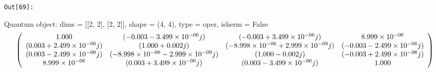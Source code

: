 \documentclass[11pt]{article}
\begin{document}
\texttt{\color{outcolor}Out[{\color{outcolor}69}]:}
    
    Quantum object: dims = [[2, 2], [2, 2]], shape = (4, 4), type = oper, isherm = False\begin{equation*}\left(\begin{array}{*{11}c}1.000 & (-0.003-3.499\times10^{-06}j) & (-0.003+3.499\times10^{-06}j) & 8.999\times10^{-06}\\(0.003+2.499\times10^{-06}j) & (1.000+0.002j) & (-8.998\times10^{-06}+2.999\times10^{-09}j) & (-0.003-2.499\times10^{-06}j)\\(0.003-2.499\times10^{-06}j) & (-8.998\times10^{-06}-2.999\times10^{-09}j) & (1.000-0.002j) & (-0.003+2.499\times10^{-06}j)\\8.999\times10^{-06} & (0.003+3.499\times10^{-06}j) & (0.003-3.499\times10^{-06}j) & 1.000\\\end{array}\right)\end{equation*}

    
\end{document}
